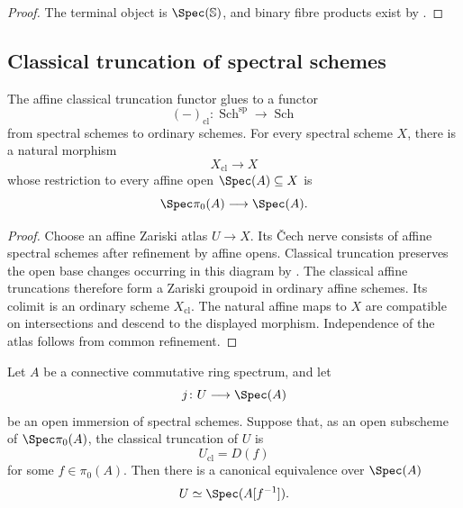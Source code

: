\begin{proof}
The terminal object is $\Spec(\mathbb S)$, and binary fibre products exist
by .
\end{proof}

\subsection{Classical truncation of spectral schemes}

\begin{theorem}
\label{thm:global-classical-truncation}
The affine classical truncation functor glues to a functor
\[
    (-)_{\mathrm{cl}}
    \colon
    \operatorname{Sch}^{\mathrm{sp}}
    \longrightarrow
    \operatorname{Sch}
\]
from spectral schemes to ordinary schemes. For every spectral scheme $X$,
there is a natural morphism
\[
    X_{\mathrm{cl}}
    \longrightarrow
    X
\]
whose restriction to every affine open $\Spec(A)\subseteq X$ is
\[
    \Spec\pi_0(A)
    \longrightarrow
    \Spec(A).
\]
\end{theorem}

\begin{proof}
Choose an affine Zariski atlas $U\to X$. Its \v{C}ech nerve consists of
affine spectral schemes after refinement by affine opens. Classical
truncation preserves the open base changes occurring in this diagram by
. The classical affine
truncations therefore form a Zariski groupoid in ordinary affine schemes.
Its colimit is an ordinary scheme $X_{\mathrm{cl}}$. The natural affine
maps to $X$ are compatible on intersections and descend to the displayed
morphism. Independence of the atlas follows from common refinement.
\end{proof}

\begin{lemma}
\label{lem:principal-classical-open-determines-spectral-open}
Let \(A\) be a connective commutative ring spectrum, and let
\[
    j
    \colon
    U
    \longrightarrow
    \Spec(A)
\]
be an open immersion of spectral schemes. Suppose that, as an open
subscheme of \(\Spec\pi_0(A)\), the classical truncation of \(U\) is
\[
    U_{\mathrm{cl}}
    =
    D(f)
\]
for some \(f\in\pi_0(A)\). Then there is a canonical equivalence over
\(\Spec(A)\)
\[
    U
    \simeq
    \Spec(A[f^{-1}]).
\]
\end{lemma}

